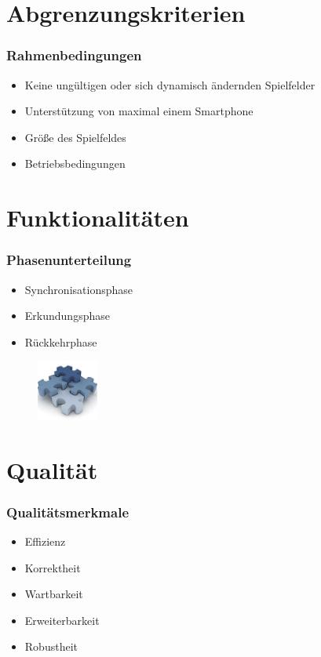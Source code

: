 \documentclass{beamer}
\begin{document}
\section{Abgrenzungskriterien}

\begin{frame}
  \frametitle{Rahmenbedingungen}
  
  	\begin{itemize}
		\item Keine ungültigen oder sich dynamisch ändernden Spielfelder
		\item Unterstützung von maximal einem Smartphone
		\item Größe des Spielfeldes
		\item Betriebsbedingungen
	\end{itemize}  
\end{frame}

\section{Funktionalitäten}
\begin{frame}
  \frametitle{Phasenunterteilung}
  
  	\begin{itemize}
		\item Synchronisationsphase
		\item Erkundungsphase
		\item Rückkehrphase
	\end{itemize}  
	\begin{figure}[bp]
		\includegraphics[height=2cm]{funktional.jpg} 
	\end{figure}
	
\end{frame}


\section{Qualität}
\begin{frame}
  \frametitle{Qualitätsmerkmale}
  
  	\begin{itemize}
		\item Effizienz
		\item Korrektheit
		\item Wartbarkeit
		\item Erweiterbarkeit
		\item Robustheit
	\end{itemize}  
\end{frame}
\end{document}
